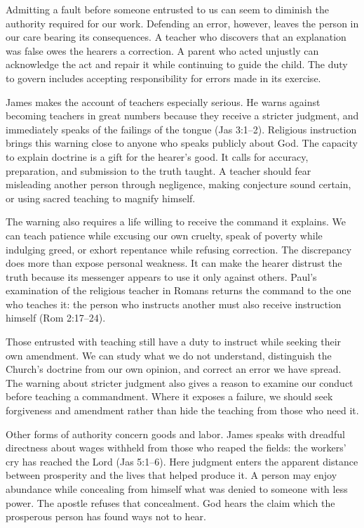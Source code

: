 Admitting a fault before someone entrusted to us can seem to diminish the authority required for our work. Defending an error, however, leaves the person in our care bearing its consequences. A teacher who discovers that an explanation was false owes the hearers a correction. A parent who acted unjustly can acknowledge the act and repair it while continuing to guide the child. The duty to govern includes accepting responsibility for errors made in its exercise.

James makes the account of teachers especially serious. He warns against becoming teachers in great numbers because they receive a stricter judgment, and immediately speaks of the failings of the tongue (Jas 3:1--2). Religious instruction brings this warning close to anyone who speaks publicly about God. The capacity to explain doctrine is a gift for the hearer's good. It calls for accuracy, preparation, and submission to the truth taught. A teacher should fear misleading another person through negligence, making conjecture sound certain, or using sacred teaching to magnify himself.

The warning also requires a life willing to receive the command it explains. We can teach patience while excusing our own cruelty, speak of poverty while indulging greed, or exhort repentance while refusing correction. The discrepancy does more than expose personal weakness. It can make the hearer distrust the truth because its messenger appears to use it only against others. Paul's examination of the religious teacher in Romans returns the command to the one who teaches it: the person who instructs another must also receive instruction himself (Rom 2:17--24).

Those entrusted with teaching still have a duty to instruct while seeking their own amendment. We can study what we do not understand, distinguish the Church's doctrine from our own opinion, and correct an error we have spread. The warning about stricter judgment also gives a reason to examine our conduct before teaching a commandment. Where it exposes a failure, we should seek forgiveness and amendment rather than hide the teaching from those who need it.

Other forms of authority concern goods and labor. James speaks with dreadful directness about wages withheld from those who reaped the fields: the workers' cry has reached the Lord (Jas 5:1--6). Here judgment enters the apparent distance between prosperity and the lives that helped produce it. A person may enjoy abundance while concealing from himself what was denied to someone with less power. The apostle refuses that concealment. God hears the claim which the prosperous person has found ways not to hear.

